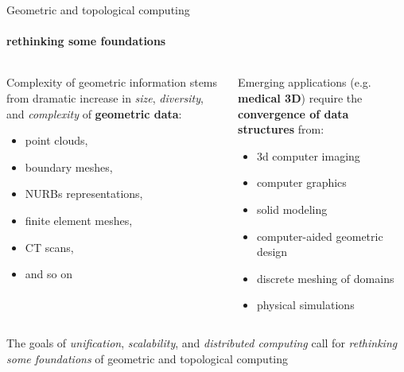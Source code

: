 \begin{frame}{Geometric and topological computing}
\protect\hypertarget{geometric-and-topological-computing}{}

\framesubtitle{rethinking some foundations}

\begin{columns}[T]
\begin{column}{0.48\textwidth}
Complexity of geometric information stems from dramatic increase in
\emph{size}, \emph{diversity}, and \emph{complexity} of
\textbf{geometric data}:

\begin{itemize}
\tightlist
\item
  point clouds,
\item
  boundary meshes,
\item
  NURBs representations,
\item
  finite element meshes,
\item
  CT scans,
\item
  and so on
\end{itemize}
\end{column}

\begin{column}{0.48\textwidth}
Emerging applications (e.g. \textbf{medical 3D}) require the
\textbf{convergence of data structures} from:

\begin{itemize}
\tightlist
\item
  3d computer imaging
\item
  computer graphics
\item
  solid modeling
\item
  computer-aided geometric design
\item
  discrete meshing of domains
\item
  physical simulations
\end{itemize}
\end{column}
\end{columns}

The goals of \emph{unification}, \emph{scalability}, and
\emph{distributed computing} call for \emph{rethinking some foundations}
of geometric and topological computing

\end{frame}

